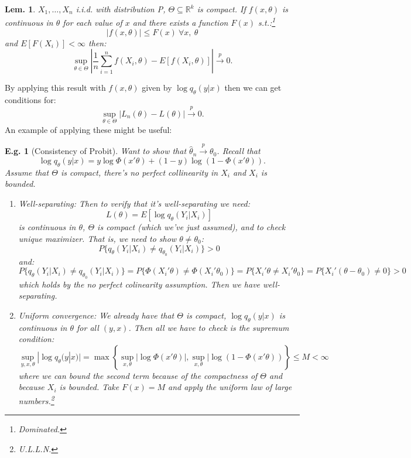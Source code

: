 \documentclass{tufte-book}
\theoremstyle{mytheoremstyle}
\theoremstyle{mylemstyle}
\newtheorem*{lem}{Lem.}
\theoremstyle{mydefstyle}
\newtheorem*{ex}{E.g.}
\begin{document}
\begin{lem} \(X_1, \dots, X_n\) i.i.d. with distribution P, \(\Theta \subseteq \mathbb{R}^k\) is compact. If \(f(x, \theta)\) is continuous in \(\theta\) for each value of \(x\) and there exists a function \(F(x)\) s.t.:\footnote{Dominated.}
	\[|f(x,\theta)| \le F(x)\ \forall x,\ \theta\]
and \(E[F(X_i)] < \infty\) then:
	\[\sup_{\theta \in \Theta} \left|\frac{1}{n} \sum_{i=1}^n f(X_i, \theta) - E[f(X_i, \theta)]\right| \overset{p}{\rightarrow} 0 \text{.}\]
\end{lem}
\noindent By applying this result with \(f(x, \theta)\) given by \(\log q_\theta (y|x)\) then we can get conditions for:
	\[\sup_{\theta \in \Theta} |L_n(\theta) - L(\theta)| \overset{p}{\rightarrow} 0 \text{.}\]
An example of applying these might be useful:
\begin{ex}[Consistency of Probit] Want to show that \(\hat{\theta}_n \overset{p}{\rightarrow} \theta_0\). Recall that
	\[\log q_\theta(y|x) = y \log \Phi(x'\theta) + (1-y) \log (1 - \Phi(x'\theta)) \text{.}\]
Assume that \(\Theta\) is compact, there's no perfect collinearity in \(X_i\) and \(X_i\) is bounded. 
\begin{enumerate}
\item \emph{Well-separating}: Then to verify that it's well-separating we need:
	\[L(\theta) = E[\log q_\theta (Y_i | X_i)]\]
is continuous in \(\theta\), \(\Theta\) is compact (which we've just assumed), and to check unique maximizer. That is, we need to show \(\theta \ne \theta_0\):
	\[P\{q_\theta (Y_i | X_i) \ne q_{\theta_0} (Y_i | X_i)\} > 0\]
and:
	\[P\{q_\theta (Y_i | X_i) \ne q_{\theta_0} (Y_i | X_i)\} = P\{\Phi(X_i'\theta) \ne \Phi(X_i' \theta_0)\} = P\{X_i'\theta \ne X_i'\theta_0\} = P\{X_i'(\theta - \theta_0) \ne 0\} > 0\]
which holds by the no perfect colinearity assumption. Then we have well-separating.
\item \emph{Uniform convergence}: We already have that \(\Theta\) is compact, \(\log q_\theta (y|x)\) is continuous in \(\theta\) for all \((y,x)\). Then all we have to check is the supremum condition:
	\[\sup_{y,x,\theta} | \log q_\theta(y|x)| = \max\left\{ \sup_{x,\theta} | \log \Phi(x'\theta)|, \sup_{x, \theta} | \log(1-\Phi(x'\theta))\right\} \le M < \infty\]
where we can bound the second term because of the compactness of \(\Theta\) and because \(X_i\) is bounded. Take \(F(x) = M\) and apply the uniform law of large numbers.\footnote{U.L.L.N.}
\end{enumerate}
\end{ex}
\end{document}
